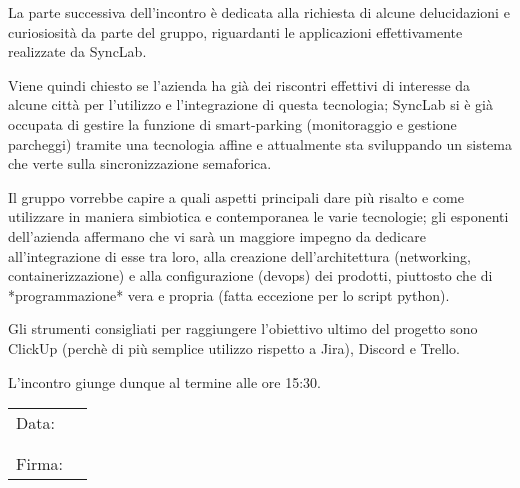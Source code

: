 \documentclass[italian,12pt]{article} %
\begin{document}
\begin{flushleft}
La parte successiva dell’incontro è dedicata alla richiesta di alcune delucidazioni e curiosiosità da parte del gruppo, 
riguardanti le applicazioni effettivamente realizzate da SyncLab.

Viene quindi chiesto se l’azienda ha già dei riscontri effettivi di interesse da alcune città per l’utilizzo e l’integrazione di questa 
tecnologia; SyncLab si è già occupata di gestire la funzione di smart-parking (monitoraggio e gestione parcheggi) tramite una tecnologia 
affine e attualmente sta sviluppando un sistema che verte sulla sincronizzazione semaforica.

Il gruppo vorrebbe capire a quali aspetti principali dare più risalto e come utilizzare in maniera simbiotica e contemporanea le 
varie tecnologie; gli esponenti dell’azienda affermano che vi sarà un maggiore impegno da dedicare all’integrazione di esse tra loro, 
alla creazione dell’architettura (networking, containerizzazione) e alla configurazione (devops) dei prodotti, 
piuttosto che di *programmazione* vera e propria (fatta eccezione per lo script python). 

Gli strumenti consigliati per raggiungere l’obiettivo ultimo del progetto sono ClickUp 
(perchè di più semplice utilizzo rispetto a Jira), Discord e Trello.

L’incontro giunge dunque al termine alle ore 15:30.

\end{flushleft}

\begin{table}[b]
	\begin{tabular}{@{}p{.5in}p{4in}@{}}
		Data:  & \hrulefill \\
			   &     		\\
			   &     		\\
		Firma: & \hrulefill \\
	\end{tabular}
	\end{table}
\end{document}

